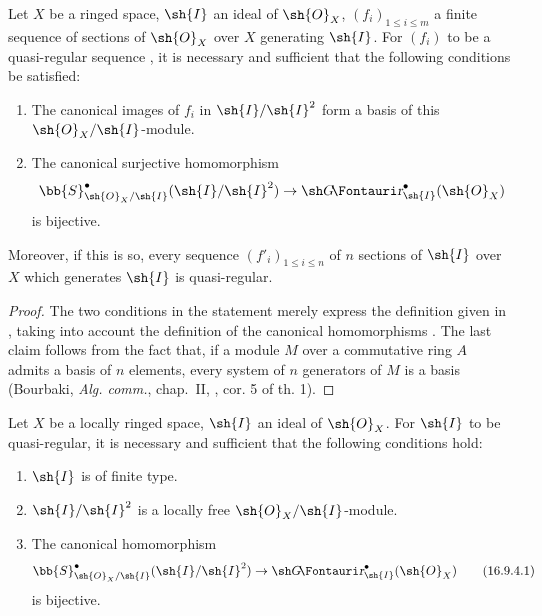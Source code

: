 \begin{proposition}[16.9.3]
\label{IV.16.9.3}
Let $X$ be a ringed space, $\sh{I}$ an ideal of $\sh{O}_X$, $(f_i)_{1 \leq i \leq m}$ a finite sequence of sections of $\sh{O}_X$ over $X$ generating $\sh{I}$.
For $(f_i)$ to be a quasi-regular sequence , it is necessary and sufficient that the following conditions be satisfied:
\begin{enumerate}
  \item[\rm{(i)}] The canonical images of $f_i$ in $\sh{I}/\sh{I}^2$ form a basis of this $\sh{O}_X/\sh{I}$-module.
  \item[\rm{(ii)}] The canonical surjective homomorphism 
  \[
    \bb{S}_{\sh{O}_X/\sh{I}}^\bullet (\sh{I}/\sh{I}^2) \to \shGr_{\sh{I}}^\bullet(\sh{O}_X) 
  \]
  is bijective.
\end{enumerate}

Moreover, if this is so, every sequence $(f'_i)_{1 \leq i \leq n}$ of $n$ sections of $\sh{I}$ over $X$ which generates $\sh{I}$ is quasi-regular.
\end{proposition}


\begin{proof}
The two conditions in the statement merely express the definition given in , taking into account the definition of the canonical homomorphisms .
The last claim follows from the fact that, if a module $M$ over a commutative ring $A$ admits a basis of $n$ elements, every system of $n$ generators of $M$ is a basis (Bourbaki, \emph{Alg. comm.}, chap.~II, , cor. 5 of th. 1).
\end{proof}

\begin{corollary}[16.9.4]
\label{IV.16.9.4}
Let $X$ be a locally ringed space, $\sh{I}$ an ideal of $\sh{O}_X$.
For $\sh{I}$ to be quasi-regular, it is necessary and sufficient that the following conditions hold:
\begin{enumerate}
  \item[\rm{(i)}] $\sh{I}$ is of finite type.
  \item[\rm{(ii)}] $\sh{I}/\sh{I}^2$ is a locally free $\sh{O}_X/\sh{I}$-module.
  \item[\rm{(iii)}] The canonical homomorphism
  \[
    \label{IV.16.9.4.1}
    \bb{S}_{\sh{O}_X/\sh{I}}^\bullet (\sh{I}/\sh{I}^2) \to \shGr_{\sh{I}}^\bullet(\sh{O}_X) 
    \tag{16.9.4.1}
  \]
  is bijective.
\end{enumerate}
\end{corollary}

